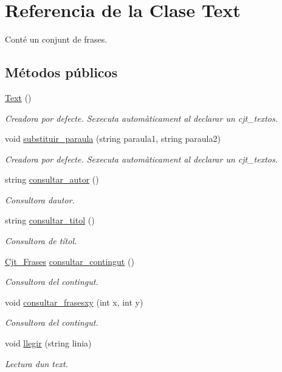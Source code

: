 \hypertarget{class_text}{}\section{Referencia de la Clase Text}
\label{class_text}


Conté un conjunt de frases.  


\subsection*{Métodos públicos}
\begin{DoxyCompactItemize}
\item 
\hyperlink{class_text_ab3e26143fccc52699bcc5149cae852bc}{Text} ()
\begin{DoxyCompactList}\small\item\em Creadora por defecte. S\textquotesingle{}executa automàticament al declarar un cjt\+\_\+textos. \end{DoxyCompactList}\item 
void \hyperlink{class_text_a03db3fb1c8edcc6f0b628f0864d865b7}{substituir\+\_\+paraula} (string paraula1, string paraula2)
\begin{DoxyCompactList}\small\item\em Creadora por defecte. S\textquotesingle{}executa automàticament al declarar un cjt\+\_\+textos. \end{DoxyCompactList}\item 
string \hyperlink{class_text_a0e8d29f53728da7b65ff1e87588ec407}{consultar\+\_\+autor} ()
\begin{DoxyCompactList}\small\item\em Consultora d\textquotesingle{}autor. \end{DoxyCompactList}\item 
string \hyperlink{class_text_ac33cbed6f5553a4901a8440e215befb6}{consultar\+\_\+titol} ()
\begin{DoxyCompactList}\small\item\em Consultora de títol. \end{DoxyCompactList}\item 
\hyperlink{class_cjt___frases}{Cjt\+\_\+\+Frases} \hyperlink{class_text_ae21dfb276d73f5a5b0994650335591c9}{consultar\+\_\+contingut} ()
\begin{DoxyCompactList}\small\item\em Consultora del contingut. \end{DoxyCompactList}\item 
void \hyperlink{class_text_aea3be7481256f9ae7121b7778c034e39}{consultar\+\_\+frasesxy} (int x, int y)
\begin{DoxyCompactList}\small\item\em Consultora del contingut. \end{DoxyCompactList}\item 
void \hyperlink{class_text_a4e7d5e74fb9065f9771bd33a5e263776}{llegir} (string linia)
\begin{DoxyCompactList}\small\item\em Lectura d\textquotesingle{}un text. \end{DoxyCompactList}\end{DoxyCompactItemize}
